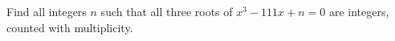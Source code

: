 Find all integers $n$ such that all three roots of $x^3-111x+n=0$ are integers, counted with multiplicity.
